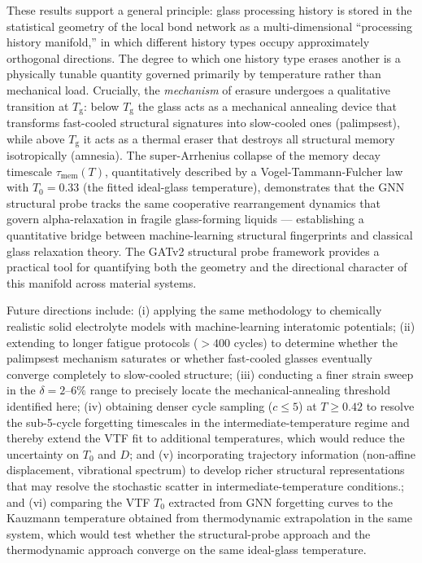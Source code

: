 \documentclass[12pt,a4paper]{article}
\newcommand{\Tg}{T_{\mathrm{g}}}
\newcommand{\vtau}{\tau_{\mathrm{mem}}}
\newcommand{\Tzero}{T_0}
\begin{document}
These results support a general principle: glass processing history is stored in the statistical geometry of the local bond network as a multi-dimensional ``processing history manifold,'' in which different history types occupy approximately orthogonal directions.
The degree to which one history type erases another is a physically tunable quantity governed primarily by temperature rather than mechanical load.
Crucially, the \emph{mechanism} of erasure undergoes a qualitative transition at $\Tg$: below $\Tg$ the glass acts as a mechanical annealing device that transforms fast-cooled structural signatures into slow-cooled ones (palimpsest), while above $\Tg$ it acts as a thermal eraser that destroys all structural memory isotropically (amnesia).
The super-Arrhenius collapse of the memory decay timescale $\vtau(T)$, quantitatively described by a Vogel-Tammann-Fulcher law with $\Tzero = 0.33$ (the fitted ideal-glass temperature), demonstrates that the GNN structural probe tracks the same cooperative rearrangement dynamics that govern alpha-relaxation in fragile glass-forming liquids — establishing a quantitative bridge between machine-learning structural fingerprints and classical glass relaxation theory.
The GATv2 structural probe framework provides a practical tool for quantifying both the geometry and the directional character of this manifold across material systems.


Future directions include:
(i) applying the same methodology to chemically realistic solid electrolyte models with machine-learning interatomic potentials;
(ii) extending to longer fatigue protocols ($>400$ cycles) to determine whether the palimpsest mechanism saturates or whether fast-cooled glasses eventually converge completely to slow-cooled structure;
(iii) conducting a finer strain sweep in the $\delta = 2$--$6\%$ range to precisely locate the mechanical-annealing threshold identified here;
(iv) obtaining denser cycle sampling ($c \leq 5$) at $T \geq 0.42$ to resolve the sub-5-cycle forgetting timescales in the intermediate-temperature regime and thereby extend the VTF fit to additional temperatures, which would reduce the uncertainty on $\Tzero$ and $D$; and
(v) incorporating trajectory information (non-affine displacement, vibrational spectrum) to develop richer structural representations that may resolve the stochastic scatter in intermediate-temperature conditions.; and
(vi) comparing the VTF $\Tzero$ extracted from GNN forgetting curves to the Kauzmann temperature obtained from thermodynamic extrapolation in the same system, which would test whether the structural-probe approach and the thermodynamic approach converge on the same ideal-glass temperature.
\end{document}
